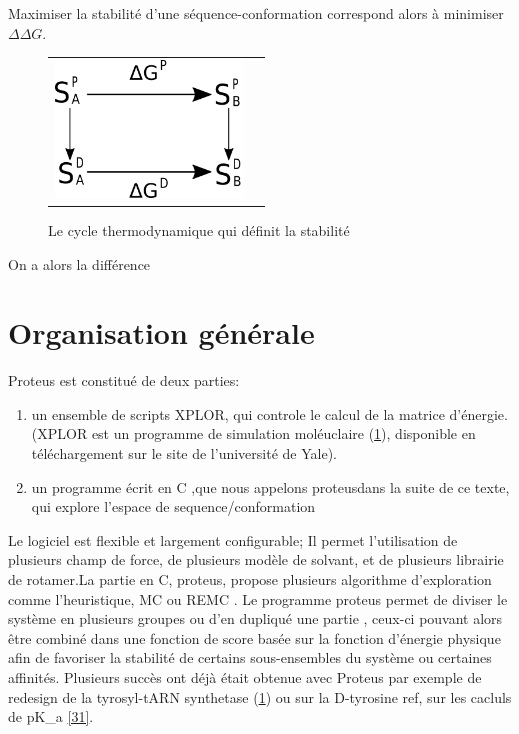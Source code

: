 Maximiser la stabilité d'une séquence-conformation correspond alors à minimiser $\Delta \Delta G$.

   \begin{figure}[!htbp]
     \centering
     \begin{tabular}{cc}
       \includegraphics[width=5cm]{figure/cycleThermo.png} &
     \end{tabular}
     
     \caption{Le cycle thermodynamique qui définit la stabilité}
\label{fig:cycleThermo}
   \end{figure}

On a alors la différence 


\section{Organisation générale}

Proteus est constitué de deux parties:

\begin{enumerate}
\item un ensemble de scripts XPLOR, qui controle le calcul de la matrice d'énergie. (XPLOR est un programme de simulation moléuclaire (\ref{}), disponible en téléchargement sur le site de l'université de Yale).
\item un programme écrit en C ,que nous appelons \og proteus\fg dans la suite de ce texte, qui explore l'espace de sequence/conformation
\end{enumerate}

Le logiciel est flexible et largement configurable; Il permet l'utilisation de plusieurs champ de force, de plusieurs modèle de solvant, et de plusieurs librairie de rotamer.La partie en C, proteus, propose plusieurs algorithme d'exploration comme l'heuristique, MC ou REMC . Le programme proteus permet de diviser le système en plusieurs groupes ou d'en dupliqué une partie , ceux-ci pouvant alors être combiné dans une fonction de score basée sur la fonction d'énergie physique afin de favoriser la stabilité de certains sous-ensembles du système ou certaines affinités.
Plusieurs succès ont déjà était obtenue avec Proteus par exemple de redesign de la tyrosyl-tARN synthetase (\ref{}) ou sur la D-tyrosine ref{}, sur les cacluls de pK_a \ref{31}.

